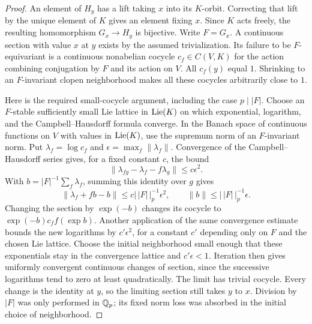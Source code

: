 \begin{proof}
An element of $H_y$ has a lift taking $x$ into its $K$-orbit.  Correcting
that lift by the unique element of $K$ gives an element fixing $x$.
Since $K$ acts freely, the resulting homomorphism $G_x\to H_y$ is
bijective.  Write $F=G_x$.  A continuous section with value $x$ at $y$
exists by the assumed trivialization.  Its failure to be $F$-equivariant
is a continuous nonabelian cocycle
$c_f\in C(V,K)$ for the action combining conjugation by $F$ and its
action on $V$.  All $c_f(y)$ equal $1$.  Shrinking to an $F$-invariant
clopen neighborhood makes all these cocycles arbitrarily close to $1$.

Here is the required small-cocycle argument, including the case
$p\mid |F|$.  Choose an $F$-stable sufficiently small Lie lattice in
$\operatorname{Lie}(K)$ on which exponential, logarithm, and the
Campbell--Hausdorff formula converge.  In the Banach space of continuous
functions on $V$ with values in $\operatorname{Lie}(K)$, use the supremum norm of an
$F$-invariant norm.  Put $\lambda_f=\log c_f$ and
$\epsilon=\max_f\|\lambda_f\|$.  Convergence of the
Campbell--Hausdorff series gives, for a fixed constant $c$, the bound
\[
 \|\lambda_{fg}-\lambda_f-f\lambda_g\|\leq c\epsilon^2.
\]
With $b=|F|^{-1}\sum_f\lambda_f$, summing this identity over $g$
gives
\[
 \|\lambda_f+fb-b\|\leq c|\,|F|\,|_p^{-1}\epsilon^2,
 \qquad \|b\|\leq |\,|F|\,|_p^{-1}\epsilon.
\]
Changing the section by $\exp(-b)$ changes its cocycle to
$\exp(-b)c_f f(\exp b)$.  Another application of the same convergence
estimate bounds the new logarithms by $c'\epsilon^2$, for a constant
$c'$ depending only on $F$ and the chosen Lie lattice.  Choose the
initial neighborhood small enough that these exponentials stay in
the convergence lattice and $c'\epsilon<1$.  Iteration then gives
uniformly convergent continuous changes of section, since the
successive logarithms tend to zero at least quadratically.  The limit
has trivial cocycle.  Every change is the identity at $y$, so the
limiting section still takes $y$ to $x$.  Division by $|F|$ was only
performed in $\mathbb Q_p$; its fixed norm loss was absorbed in the initial
choice of neighborhood.
\end{proof}


